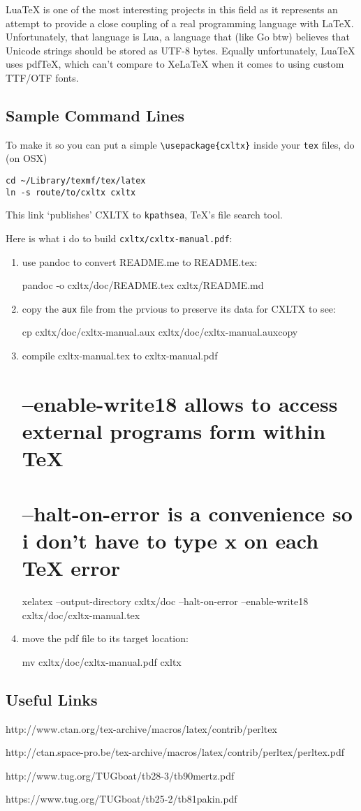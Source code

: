 LuaTeX is one of the most interesting projects in this field as it
represents an attempt to provide a close coupling of a real programming
language with LaTeX. Unfortunately, that language is Lua, a language
that (like Go btw) believes that Unicode strings should be stored as
UTF-8 bytes. Equally unfortunately, LuaTeX uses pdfTeX, which can't
compare to XeLaTeX when it comes to using custom TTF/OTF fonts.

\subsection{Sample Command Lines}\label{sample-command-lines}

To make it so you can put a simple
\texttt{\textbackslash{}usepackage\{cxltx\}} inside your \texttt{tex}
files, do (on OSX)

\begin{verbatim}
cd ~/Library/texmf/tex/latex
ln -s route/to/cxltx cxltx
\end{verbatim}

This link `publishes' CXLTX to \texttt{kpathsea}, TeX's file search
tool.

Here is what i do to build \texttt{cxltx/cxltx-manual.pdf}:

\begin{enumerate}
\def\labelenumi{(\arabic{enumi})}
\item
  use pandoc to convert README.me to README.tex:

  pandoc -o cxltx/doc/README.tex cxltx/README.md
\item
  copy the \texttt{aux} file from the prvious to preserve its data for
  CXLTX to see:

  cp cxltx/doc/cxltx-manual.aux cxltx/doc/cxltx-manual.auxcopy
\item
  compile cxltx-manual.tex to cxltx-manual.pdf

  \section{--enable-write18 allows to access external programs form
  within
  TeX}\label{enable-write18-allows-to-access-external-programs-form-within-tex}

  \section{--halt-on-error is a convenience so i don't have to type x on
  each TeX
  error}\label{halt-on-error-is-a-convenience-so-i-dont-have-to-type-x-on-each-tex-error}

  xelatex --output-directory cxltx/doc --halt-on-error --enable-write18
  cxltx/doc/cxltx-manual.tex
\item
  move the pdf file to its target location:

  mv cxltx/doc/cxltx-manual.pdf cxltx
\end{enumerate}

\subsection{Useful Links}\label{useful-links}

http://www.ctan.org/tex-archive/macros/latex/contrib/perltex

http://ctan.space-pro.be/tex-archive/macros/latex/contrib/perltex/perltex.pdf

http://www.tug.org/TUGboat/tb28-3/tb90mertz.pdf

https://www.tug.org/TUGboat/tb25-2/tb81pakin.pdf
